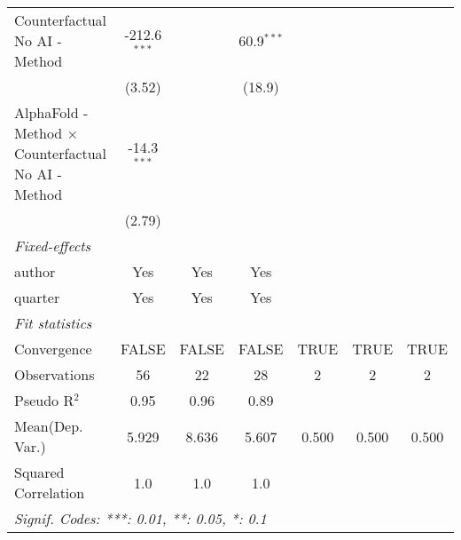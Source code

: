 \begin{tabular}{lcccccc}
   Counterfactual No AI - Method                              & -212.6$^{***}$ &         & 60.9$^{***}$  &      &      &   \\   
                                                              & (3.52)         &         & (18.9)        &      &      &   \\   
   AlphaFold - Method $\times$ Counterfactual No AI - Method  & -14.3$^{***}$  &         &               &      &      &   \\   
                                                              & (2.79)         &         &               &      &      &   \\   
   \midrule
   \emph{Fixed-effects}\\
   author                                                     & Yes            & Yes     & Yes           &      &      & \\  
   quarter                                                    & Yes            & Yes     & Yes           &      &      & \\  
   \midrule
   \emph{Fit statistics}\\
   Convergence                                                &FALSE           & FALSE   & FALSE         & TRUE & TRUE & TRUE\\  
   Observations                                               & 56             & 22      & 28            & 2    & 2    & 2\\  
   Pseudo R$^2$                                               & 0.95           & 0.96    & 0.89          &      &      & \\  
Mean(Dep. Var.) & 5.929 & 8.636 & 5.607 & 0.500 & 0.500 & 0.500 \\
   Squared Correlation                                        & 1.0            & 1.0     & 1.0           &      &      & \\  
   \midrule \midrule
   \multicolumn{7}{l}{\emph{Signif. Codes: ***: 0.01, **: 0.05, *: 0.1}}\\
\end{tabular}
\par\endgroup

